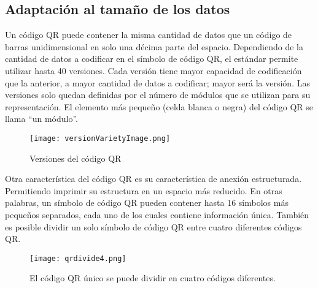 \subsection{Adaptación al tamaño de los datos}
Un código QR puede contener la misma cantidad de datos que un código de barras unidimensional en solo una décima parte del espacio.\cite{2012_DENSO}
Dependiendo de la cantidad de datos a codificar en el símbolo de código QR, el estándar permite utilizar hasta 40 versiones. Cada versión tiene mayor capacidad de codificación que la anterior, a mayor cantidad de datos a codificar; mayor será la versión. Las versiones solo quedan definidas por el número de módulos que se utilizan para su representación. El elemento más pequeño (celda blanca o negra) del código QR se llama ``un módulo''. \cite{2012_Encinas}
\begin{figure} 
\centering
\texttt{[image: versionVarietyImage.png]}
\caption{Versiones del código QR}
\label{fig:Versiones}
\end{figure} 
Otra característica del código QR es su característica de anexión estructurada. Permitiendo imprimir su estructura en un espacio más reducido. En otras palabras, un símbolo de código QR pueden contener hasta 16 símbolos más pequeños separados, cada uno de los cuales contiene información única. También es posible dividir un solo símbolo de código QR entre cuatro diferentes códigos QR.\cite{2014_Chang}
\begin{figure} 
\centering
\texttt{[image: qrdivide4.png]}
\caption{El código QR único se puede dividir en cuatro códigos diferentes.}
\label{fig:qrdivide4}
\end{figure} 

